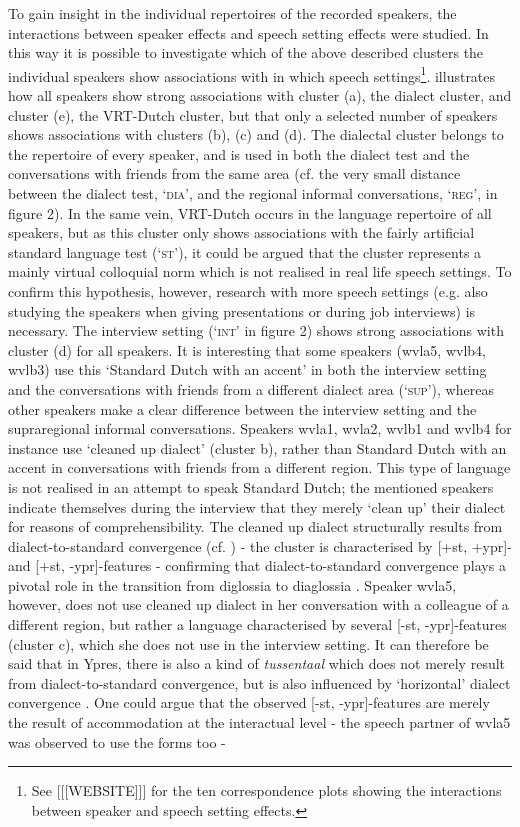 \documentclass[output=paper]{LSP/langsci}
\begin{document}
To gain insight in the individual repertoires of the recorded speakers, the interactions between speaker effects and speech setting effects were studied. In this way it is possible to investigate which of the above described clusters the individual speakers show associations with in which speech settings\footnote{See [[[WEBSITE]]] for the ten correspondence plots showing the interactions between speaker and speech setting effects.}.  illustrates how all speakers show strong associations with cluster (a), the dialect cluster, and cluster (e), the VRT-Dutch cluster, but that only a selected number of speakers shows associations with clusters (b), (c) and (d). The dialectal cluster belongs to the repertoire of every speaker, and is used in both the dialect test and the conversations with friends from the same area (cf. the very small distance between the dialect test, ‘\textsc{dia’}, and the regional informal conversations, ‘\textsc{reg’}, in figure 2). In the same vein, VRT-Dutch occurs in the language repertoire of all speakers, but as this cluster only shows associations with the fairly artificial standard language test (‘\textsc{st’}), it could be argued that the cluster represents a mainly virtual colloquial norm which is not realised in real life speech settings. To confirm this hypothesis, however, research with more speech settings (e.g. also studying the speakers when giving presentations or during job interviews) is necessary. The interview setting (‘\textsc{int’} in figure 2) shows strong associations with cluster (d) for all speakers. It is interesting that some speakers (wvla5, wvlb4, wvlb3) use this ‘Standard Dutch with an accent’ in both the interview setting and the conversations with friends from a different dialect area (‘\textsc{sup’}), whereas other speakers make a clear difference between the interview setting and the supraregional informal conversations. Speakers wvla1, wvla2, wvlb1 and wvlb4 for instance use ‘cleaned up dialect’ (cluster b), rather than Standard Dutch with an accent in conversations with friends from a different region. This type of language is not realised in an attempt to speak Standard Dutch; the mentioned speakers indicate themselves during the interview that they merely ‘clean up’ their dialect for reasons of comprehensibility. The cleaned up dialect structurally results from dialect-to-standard convergence (cf. \citealt[25]{auer_europes_2005}) - the cluster is characterised by [+st, +ypr]- and [+st, -ypr]-features - confirming that dialect-to-standard convergence plays a pivotal role in the transition from diglossia to diaglossia \citep{auer_convergence_1996}. Speaker wvla5, however, does not use cleaned up dialect in her conversation with a colleague of a different region, but rather a language characterised by several [-st, -ypr]-features (cluster c), which she does not use in the interview setting. It can therefore be said that in Ypres, there is also a kind of \textit{tussentaal} which does not merely result from dialect-to-standard convergence, but is also influenced by ‘horizontal’ dialect convergence \citep{auer_convergence_1996}. One could argue that the observed [-st, -ypr]-features are merely the result of accommodation at the interactual level - the speech partner of wvla5 was observed to use the forms too - 
\end{document}
